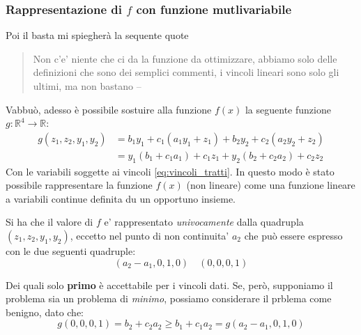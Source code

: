 
\subsubsection{Rappresentazione di $f$ con funzione mutlivariabile}
Poi il basta mi spiegherà la sequente quote 
\begin{quote}
  Non c'e' niente che ci da la funzione da ottimizzare, abbiamo solo delle definizioni che sono dei semplici commenti, i vincoli lineari sono solo gli ultimi, ma non bastano
  \hfill -- \faWhatsapp  
\end{quote}

Vabbuò, adesso è possibile sostuire alla funzione $f(x)$ la seguente funzione $g:\mathbb{R}^4\to \mathbb{R}$:
\[
  \begin{aligned}
    g(z_1, z_2, y_1,y_2 ) &= b_1y_1 + c_1(a_1y_1+z_1) + b_2y_2 + c_2(a_2y_2 + z_2) \\
    &= y_1(b_1+c_1a_1)+c_1z_1 + y_2(b_2+c_2a_2) + c_2z_2
  \end{aligned}
\]
Con le variabili soggette ai vincoli \ref{eq:vincoli_tratti}. In questo modo è stato possibile rappresentare la funzione $f(x)$ (non lineare) come una funzione lineare a variabili continue definita du un opportuno insieme.

Si ha che il valore di $ f $ e' rappresentato \textit{univocamente} dalla quadrupla $(z_1, z_2,y_1,y_2)$, eccetto nel punto di non continuita' $a_2$ che può essere espresso con le due seguenti quadruple:
\[
  (a_2 - a_1, 0, 1, 0) \quad (0, 0, 0, 1)
\] 

Dei quali solo \textbf{primo} è accettabile per i vincoli dati. Se, però, supponiamo il problema sia un problema di \textit{minimo}, possiamo considerare il prblema come benigno, dato che:
\[
  g(0,0,0,1) = b_2+c_2a_2 \geq b_1+c_1a_2 = g(a_2-a_1,0,1,0)
\]

